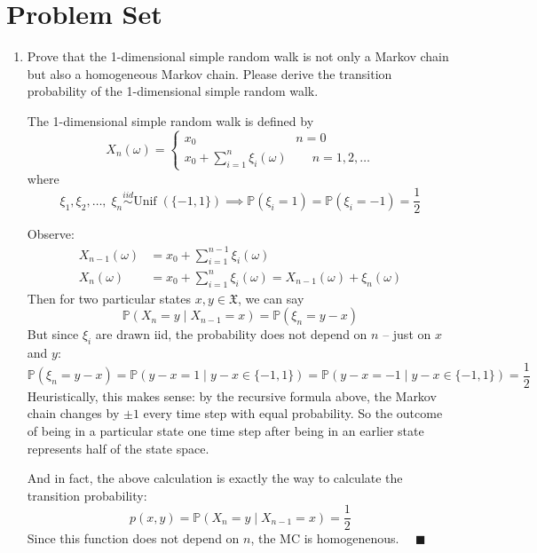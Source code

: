 \documentclass[11pt,letterpaper, leqno]{article}
\numberwithin{equation}{section}
\numberwithin{theorem}{section}
\numberwithin{lemma}{section}
\numberwithin{corollary}{section}
\numberwithin{definition}{section}
\numberwithin{proposition}{section}
\numberwithin{remark}{section}
\numberwithin{example}{section}
\renewcommand{\P}{\mathbb{P}}
\newcommand{\Unif}{\text{Unif}\;}
\newcommand{\mfX}{\mathfrak{X}}
\renewcommand{\qed}{\quad \blacksquare}
\begin{document}
\newpage

\section{Problem Set}

\begin{enumerate}
    \item Prove that the 1-dimensional simple random walk is not only a Markov chain but also a homogeneous Markov chain. Please derive the transition probability of the 1-dimensional simple random walk.

        \color{blue}
            The 1-dimensional simple random walk is defined by 
            \[X_n(\omega) = \begin{cases}
                x_0 \qquad \qquad \qquad \qquad \! n =0 \\
                x_0 + \sum_{i=1}^n \xi_i(\omega) \qquad n = 1, 2, \dots
            \end{cases}\] 
            where 
            \[\xi_1, \xi_2, \dots,\; \xi_n \overset{iid}{\sim} \Unif(\{-1, 1\}) \implies \P(\xi_i = 1) = \P(\xi_i = -1) = \frac{1}{2}\]

            Observe:
            \begin{align*}
                X_{n-1}(\omega) &= x_0 + \sum_{i=1}^{n-1} \xi_i(\omega)\\
                X_n(\omega) &= x_0 + \sum_{i=1}^n \xi_{i}(\omega) = X_{n-1}(\omega) + \xi_n(\omega) 
            \end{align*}
            Then for two particular states $x, y \in \mfX$, we can say 
            \[\P(X_n = y \; | \; X_{n-1} = x) = \P(\xi_n = y - x)\]
            But since $\xi_i$ are drawn iid, the probability does not depend on $n$ -- just on $x$ and $y$: 
            \[\P(\xi_n = y - x) = \P(y - x = 1 \; | \; y -x \in \{-1, 1\}) = \P(y - x = -1 \; | \; y - x \in \{-1, 1\}) = \frac{1}{2}\]
            Heuristically, this makes sense: by the recursive formula above, the Markov chain changes by $\pm 1$ every time step with equal probability. So the outcome of being in a particular state one time step after being in an earlier state represents half of the state space. 

            And in fact, the above calculation is exactly the way to calculate the transition probability:
            \[p(x, y) = \P(X_n = y \; | \; X_{n-1} = x) = \frac{1}{2}\]
            Since this function does not depend on $n$, the MC is homogenenous. $\qed$


\end{enumerate}
\end{document}
